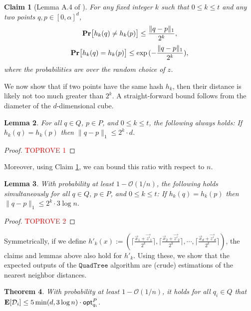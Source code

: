 \documentclass[11pt]{article}
\theoremstyle{plain}
\newtheorem{theorem}{Theorem}[section]
\newtheorem{lem}[theorem]{Lemma}
\newtheorem{clm}[theorem]{Claim}
\newcommand{\OO}{\mathcal{O}}
\newcommand{\pr}[1]{\text{\bf Pr}\normalfont\bigl[ #1 \bigr]}
\newcommand{\e}[1]{\text{\bf E}\normalfont\lbrack #1 \rbrack}
\newcommand{\opt}{\mathsf{opt}}
\newcommand{\QuadTree}{\texttt{QuadTree}} \usepackage{microtype}
\begin{document}
\begin{clm}[Lemma A.4 of \cite{BIJ24}]\label{Claim:cite}
    For any fixed integer $k$ such that $0 \leq k \leq t$ and any two points $q, p \in [0, \alpha]^d$,
\[
\pr{h_k(q) \neq h_k(p)} \leq \frac{\lVert q- p \rVert_1}{2^k},
\]\[
\pr{h_k(q) = h_k(p)} \leq \exp{(-\frac{\lVert q- p \rVert_1}{2^k})},
\]
where the probabilities are over the random choice of $z$.
\end{clm}


We now show that if two points have the same hash $h_k$, then their distance is likely not too much greater than $2^k$. A straight-forward bound follows from the diameter of the $d$-dimensional cube.

\begin{lem}\label{Lemma:cube}
    For all $q \in Q$, $p \in P$, and $0 \leq k \leq t$, the following always holds: If $h_k(q) = h_k(p)$ then $\lVert  q- p \rVert_1  \leq 2^k\cdot d$.
\end{lem}

\begin{proof}\textcolor{red}{TOPROVE 1}\end{proof}

Moreover, using Claim \ref{Claim:cite}, we can bound this ratio with respect to $n$.

\begin{lem}\label{Lemma:logn}
With probability at least $1-\OO(1/n)$, the following holds simultaneously for all $q \in Q$, $p \in P$, and $0 \leq k \leq t$: If $h_k(q) = h_k(p)$ then $\lVert  q- p \rVert_1  \leq 2^k\cdot 3\log n$.
\end{lem}

\begin{proof}\textcolor{red}{TOPROVE 2}\end{proof}




Symmetrically, if we define $h'_k(x) := (\lceil\frac{\vec{x}_1+\vec{z'}_1}{2^k}\rceil, \lceil\frac{\vec{x}_2+\vec{z'}_2}{2^k}\rceil, \cdots, \lceil\frac{\vec{x}_d+\vec{z'}_d}{2^k}\rceil)$, the  claims and lemmas above also hold for $h'_k$.
Using these, we show that the expected outputs of the $\QuadTree$ algorithm are (crude) estimations of the nearest neighbor distances. 

\begin{theorem}\label{Theorem:quadtree}
    With probability at least $1 - \OO(1/n)$, it holds for all $q_i \in Q$ that $\e{\mathcal{D}_i} \leq 5 \min (d, 3\log n) \cdot \opt_{q_i}^P$.
\end{theorem}
\end{document}
